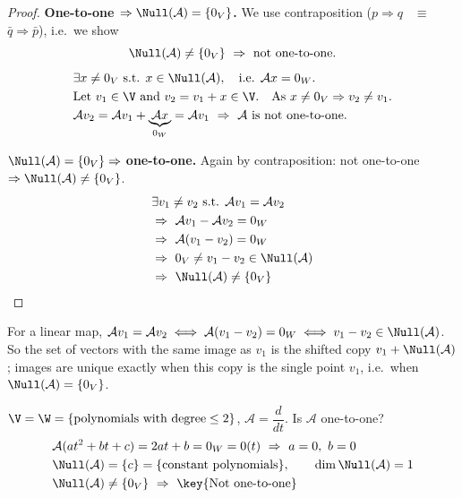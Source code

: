 \begin{proof}
\textbf{One-to-one $\Rightarrow \Null(\mathcal{A})=\{0_V\}$.}
We use contraposition ($p\Rightarrow q$ \ $\equiv$ \ $\bar q\Rightarrow \bar p$), i.e.\ we show
\[
\Null(\mathcal{A})\ne\{0_V\} \ \Rightarrow\ \text{not one-to-one.}
\]
\begin{align*}
&\exists x\ne 0_V \text{ s.t. } x\in\Null(\mathcal{A}), \quad\text{i.e. } \mathcal{A}x=0_W.\\
&\text{Let } v_1\in\V \text{ and } v_2=v_1+x\in\V. \quad\text{As } x\ne 0_V \Rightarrow v_2\ne v_1.\\
&\mathcal{A}v_2=\mathcal{A}v_1+\underbrace{\mathcal{A}x}_{0_W}=\mathcal{A}v_1
  \ \Rightarrow\ \mathcal{A} \text{ is not one-to-one.}
\end{align*}

\textbf{$\Null(\mathcal{A})=\{0_V\}\Rightarrow$ one-to-one.}
Again by contraposition: not one-to-one $\Rightarrow \Null(\mathcal{A})\ne\{0_V\}$.
\begin{align*}
&\exists v_1\ne v_2 \text{ s.t. } \mathcal{A}v_1=\mathcal{A}v_2\\
&\Rightarrow\ \mathcal{A}v_1-\mathcal{A}v_2=0_W\\
&\Rightarrow\ \mathcal{A}(v_1-v_2)=0_W\\
&\Rightarrow\ 0_V\ne v_1-v_2\in\Null(\mathcal{A})\\
&\Rightarrow\ \Null(\mathcal{A})\ne\{0_V\} \qedhere
\end{align*}
\end{proof}
\begin{insight}
For a linear map, $\mathcal{A}v_1=\mathcal{A}v_2\iff\mathcal{A}(v_1-v_2)=0_W\iff v_1-v_2\in\Null(\mathcal{A})$. So the set of vectors with the same image as $v_1$ is the shifted copy $v_1+\Null(\mathcal{A})$; images are unique exactly when this copy is the single point $v_1$, i.e.\ when $\Null(\mathcal{A})=\{0_V\}$.
\end{insight}

\begin{example}\leavevmode{}
$\V=\W=\{\text{polynomials with degree}\le 2\}$, \quad $\mathcal{A}=\dfrac{d}{dt}$. \quad Is $\mathcal{A}$ one-to-one?
\begin{align*}
&\mathcal{A}(at^2+bt+c)=2at+b=0_W=0(t) \ \Rightarrow\ a=0,\ b=0\\
&\Null(\mathcal{A})=\{c\}=\{\text{constant polynomials}\}, \qquad \dim\Null(\mathcal{A})=1\\
&\Null(\mathcal{A})\ne\{0_V\}\ \Rightarrow\ \text{\key{Not one-to-one}}
\end{align*}
\end{example}


